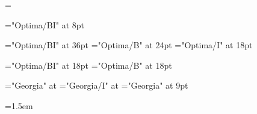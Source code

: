 \def\displayfontname{Optima}
\def\bodyfontname{Georgia}
\newdimen\bodyfontsize \bodyfontsize=12pt
\newdimen\leading \leading=15pt
\normalbaselineskip=\leading

\def\makefont#1#2#3#4{\font#1="#2#4" at #3}

\def\makebodyfont#1#2{\makefont{#1}{\bodyfontname}{\bodyfontsize}{#2}}

\def\makedisplayfont#1#2#3{\makefont{#1}{\displayfontname}{#2}{#3}}

\makedisplayfont{\pageheaderfont}{8pt}{/BI}
\def\pagefooterfont{\pageheaderfont}

\makedisplayfont{\titlepagetitlefont}{36pt}{/BI}
\makedisplayfont{\titlepageauthorfont}{24pt}{/B}
\makedisplayfont{\titlepagepublisherfont}{18pt}{/I}

\makedisplayfont{\infopagetitlefont}{18pt}{/BI}
\makedisplayfont{\sectiontitlefont}{18pt}{/B}

\makebodyfont{\bodyrm}{}
\makebodyfont{\bodyit}{/I}
\makefont{\colophonfont}{\bodyfontname}{9pt}{}

\def\leadin#1{{\leadinstyle#1}}
\def\leadinstyle{\noindent\bodyit}

\def\emph#1{{\bodyit #1}}

\normalbaselines
\raggedbottom
\bodyrm
\emergencystretch=1.5em
